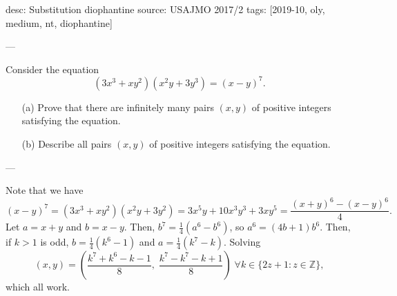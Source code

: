 desc: Substitution diophantine
source: USAJMO 2017/2
tags: [2019-10, oly, medium, nt, diophantine]

---

Consider the equation \[(3x^3+xy^2)(x^2y+3y^3)=(x-y)^7.\]
\begin{enumerate}[itemsep=0em]
    \item[(a)] Prove that there are infinitely many pairs $(x,y)$ of positive integers satisfying the equation.
    \item[(b)] Describe all pairs $(x,y)$ of positive integers satisfying the equation.
\end{enumerate}

---

Note that we have \[(x-y)^7=(3x^3+xy^2)(x^2y+3y^2)=3x^5y+10x^3y^3+3xy^5=\frac{(x+y)^6-(x-y)^6}4.\]
Let $a=x+y$ and $b=x-y$. Then, $b^7=\tfrac14(a^6-b^6)$, so $a^6=(4b+1)b^6$. Then, if $k>1$ is odd, $b=\tfrac14(k^6-1)$ and $a=\tfrac14(k^7-k)$. Solving \[\boxed{(x,y)=\left(\frac{k^7+k^6-k-1}8,\;\frac{k^7-k^7-k+1}8\right)\;\forall k\in\{2z+1:z\in\mathbb Z\}},\]
which all work.
